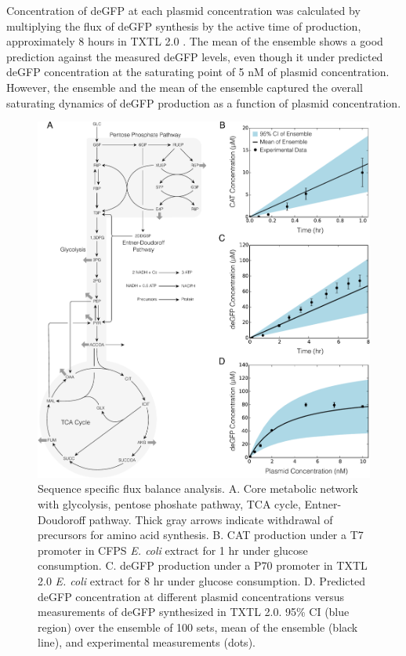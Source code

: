\documentclass[journal=asbcd6,manuscript=article]{achemso}
\begin{document}
Concentration of deGFP at each plasmid concentration was calculated by multiplying the flux of deGFP synthesis by the active time of production, approximately 8 hours in TXTL 2.0 \cite{Garamella:2016aa}.
The mean of the ensemble shows a good prediction against the measured deGFP levels, even though it under predicted deGFP concentration at the saturating point of 5 nM of plasmid concentration.
However, the ensemble and the mean of the ensemble captured the overall saturating dynamics of deGFP production as a function of plasmid concentration.
\begin{figure}[t!]
\centering
\includegraphics[width=1.00\textwidth]{./Figures/ssFBA_network.pdf}
\caption{Sequence specific flux balance analysis. A. Core metabolic network with glycolysis, pentose phoshate pathway, TCA cycle, Entner-Doudoroff pathway. Thick gray arrows indicate withdrawal of precursors for amino acid synthesis. B. CAT production under a T7 promoter in CFPS \textit{E. coli} extract for 1 hr under glucose consumption. C. deGFP production under a P70 promoter in TXTL 2.0 \textit{E. coli} extract for 8 hr under glucose consumption. D. Predicted deGFP concentration at different plasmid concentrations versus measurements of deGFP synthesized in TXTL 2.0. 95\% CI (blue region) over the ensemble of 100 sets, mean of the ensemble (black line), and experimental measurements (dots).}
\label{fig:network}
\end{figure}
\end{document}
